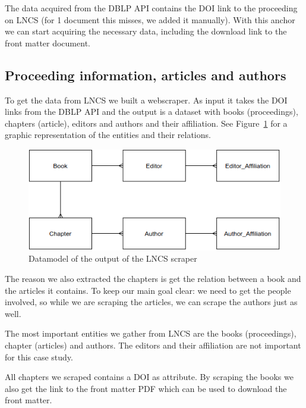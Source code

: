 \documentclass{ou-report}
\newcommand{\doi}{{DOI}}
\newcommand{\lncs}{LNCS}
\newcommand{\dblp}{DBLP}
\newcommand{\api}{API}
\begin{document}
The data acquired from the DBLP API contains the DOI link to 
the proceeding on LNCS (for 1 document this misses, we added it manually). 
With this anchor we can start acquiring the necessary data, including the 
download link to the front matter document.

\subsection{Proceeding information, articles and authors}
\label{subsec:springer_website}
To get the data from \lncs{} we built a webscraper. As input it 
takes the \doi{} links from the \dblp{} \api{} and the output is a dataset with books 
(proceedings), chapters (article), editors and authors and their affiliation. 
See Figure~\ref{fig:lncs_scraper_datamodel} for a graphic representation of the 
entities and their relations.

\begin{figure}[H]
    \centering
    \includegraphics[width=12cm]{images/lncs_scraper_datamodel.drawio.png}
    \caption{Datamodel of the output of the \lncs{} scraper}
    \label{fig:lncs_scraper_datamodel}
\end{figure}

The reason we also extracted the chapters is get the relation between a book and
the articles it contains. To keep our main goal clear: we need to get the people
involved, so while we are scraping the articles, we can scrape the authors just 
as well.

The most important entities we gather from \lncs{} are the books (proceedings), 
chapter (articles) and authors. The editors and their affiliation are not 
important for this case study. 

All chapters we scraped contains a \doi{} as attribute. 
By scraping the books we also get the link to the front matter PDF which can be 
used to download the front matter.

\end{document}
